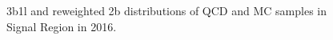 \begin{figure}[ht]
 

    \caption{3b1l and reweighted 2b distributions of QCD and \ttbar MC samples in Signal Region in 2016.}
    \label{fig:data-weights-3b1l-SR-2016}
\end{figure}


